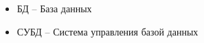 \begin{itemize}[label=]
	\item БД -- База данных
	\item СУБД -- Система управления базой данных
\end{itemize}

\clearpage